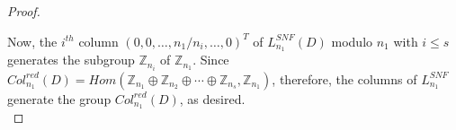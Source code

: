 \documentclass[10pt,a4paper]{amsart}
\begin{document}
\begin{proof}
\

Now, the $i^{\mathit{th}}$ column $(0, 0, \dots, n_{1}/n_{i}, \dots, 0)^T$ of $L^{SNF}_{n_1}(D)$ modulo $n_1$  with $i \le s$ generates the subgroup  $\mathbb{Z}_{n_i}$ of $\mathbb{Z}_{n_1}$. Since $Col^{red}_{n_1}(D) = Hom(\mathbb Z_{n_1}\oplus \mathbb Z_{n_2}\oplus \cdots  \oplus \mathbb Z_{n_s},  \mathbb Z_{n_1})$, therefore, the columns of $L^{SNF}_{n_1}$ generate the group $Col^{red}_{n_1}(D)$, as desired.\\
\end{proof}
\end{document}

